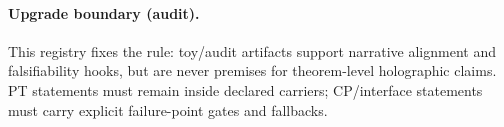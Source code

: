 \paragraph{Upgrade boundary (audit).} \AuditTag This registry fixes the rule: toy/audit artifacts support narrative alignment and falsifiability hooks, but are never premises for theorem-level holographic claims. PT statements must remain inside declared carriers; CP/interface statements must carry explicit failure-point gates and fallbacks.